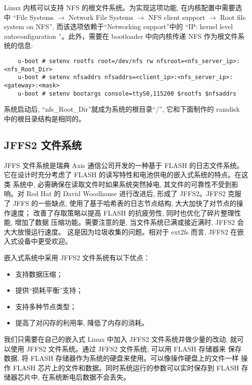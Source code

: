 	Linux 内核可以支持 NFS 的根文件系统。为实现这项功能, 在内核配置中需要选中
``File Systems $\to$ Network File Systems $\to$  NFS client support  $\to$
 Root file system on NFS'', 而该选项依赖于``Networking support''中的
``IP: kernel level autoconfiguration ''。此外，需要在 bootloader 中向内核传递
NFS 作为根文件系统的信息:

\begin{boxedminipage}{.9\textwidth}
\begin{verbatim}
	u-boot # setenv rootfs root=/dev/nfs rw nfsroot=<nfs_server_ip>:<nfs_Root_Dir>
	u-boot # setenv nfsaddrs nfsaddrs=<client_ip>:<nfs_server_ip>:<gateway>:<mask>
	u-boot # setenv bootargs console=ttyS0,115200 $rootfs $nfsaddrs
\end{verbatim}
\end{boxedminipage}

    系统启动后, ``nfs\_Root\_Dir''就成为系统的根目录``/'', 它和下面制作的
ramdisk 中的根目录结构是相同的。

\subsection{JFFS2 文件系统}
	JFFS 文件系统是瑞典 Axis 通信公司开发的一种基于 FLASH 的日志文件系统。
它在设计时充分考虑了 FLASH 的读写特性和电池供电的嵌入式系统的特点。在这类
系统中, 必需确保在读取文件时如果系统突然掉电, 其文件的可靠性不受到影响。对
Red Hat 的 David Woodhouse 进行改进后, 形成了 JFFS2。JFFS2 克服了 JFFS
的一些缺点, 使用了基于哈希表的日志节点结构, 大大加快了对节点的操作速度；
改善了存取策略以提高 FLASH 的抗疲劳性, 同时也优化了碎片整理性能, 增加了数据
压缩功能。需要注意的是, 当文件系统已满或接近满时, JFFS2 会大大放慢运行速度。
这是因为垃圾收集的问题。相对于 ext2fs 而言, JFFS2 在嵌入式设备中更受欢迎。

	嵌入式系统中采用 JFFS2 文件系统有以下优点：
\begin{itemize}\itemsep=-3pt
  \item 支持数据压缩；
  \item 提供``损耗平衡''支持；
  \item 支持多种节点类型；
  \item 提高了对闪存的利用率, 降低了内存的消耗。
\end{itemize}

	我们只需要在自己的嵌入式 Linux 中加入 JFFS2 文件系统并做少量的改动, 
就可以使用 JFFS2 文件系统。通过 JFFS2 文件系统, 可以用 FLASH 存储器来
保存数据, 将 FLASH 存储器作为系统的硬盘来使用。可以像操作硬盘上的文件一样
操作 FLASH 芯片上的文件和数据。同时系统运行的参数可以实时保存到 FLASH
存储器芯片中, 在系统断电后数据不会丢失。

